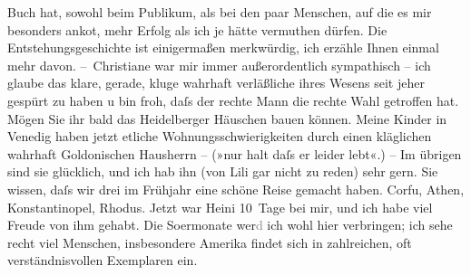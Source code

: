 \begin{ledgroupsized}[t]{13cm}
               Buch hat, sowohl beim Publikum, als bei den paar Menschen, auf die es \introOben{}mir\introOben{} besonders anko{\geminationm}t, mehr Erfolg
               als ich je hätte vermuthen dürfen. Die Entstehungsgeschichte ist einigermaßen
               merkwürdig, ich erzähle Ihnen einmal mehr davon.\pend
           \pstart
           – Christiane war mir immer außerordentlich
               sympathisch – ich glaube das klare, gerade, kluge wahrhaft verläßliche ihres Wesens
               seit jeher gespürt zu haben u bin froh, daſs der rechte Mann die rechte Wahl getroffen hat. Mögen
               Sie ihr bald das Heidelberger Häuschen bauen
               können. Meine Kinder in Venedig haben jetzt etliche
               Wohnungsschwierigkeiten durch einen kläglichen wahrhaft Goldonischen Hausherrn – (»nur halt daſs er leider lebt«.) – Im übrigen
               sind sie glücklich, und ich hab ihn (von Lili gar nicht zu reden) sehr
               gern. Sie wissen, daſs wir drei im Frühjahr eine schöne Reise gemacht haben. Corfu, Athen, Kon{\pb}stantinopel, Rhodus. Jetzt war Heini 10 Tage bei mir, und ich habe viel Freude
               von ihm gehabt.\pend
           \pstart
           Die So{\geminationm}ermonate wer\textcolor{gray}{d} ich wohl hier
               verbringen; ich sehe recht viel Menschen, insbesondere Amerika findet sich in zahlreichen, oft verständnisvollen Exemplaren ein.

\end{ledgroupsized}
